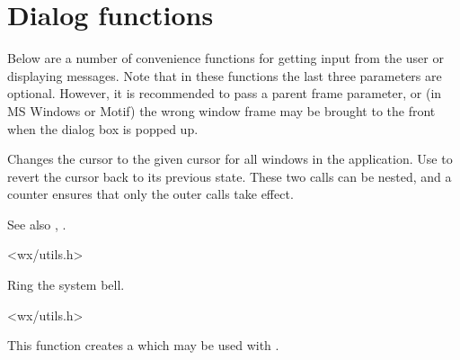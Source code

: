 \section{Dialog functions}\label{dialogfunctions}

Below are a number of convenience functions for getting input from the
user or displaying messages. Note that in these functions the last three
parameters are optional. However, it is recommended to pass a parent frame
parameter, or (in MS Windows or Motif) the wrong window frame may be brought to
the front when the dialog box is popped up.


\label{wxbeginbusycursor}


Changes the cursor to the given cursor for all windows in the application.
Use  to revert the cursor back
to its previous state. These two calls can be nested, and a counter
ensures that only the outer calls take effect.

See also , .


<wx/utils.h>


\label{wxbell}


Ring the system bell.


<wx/utils.h>


\label{wxcreatefiletipprovider}


This function creates a  which may be
used with .





